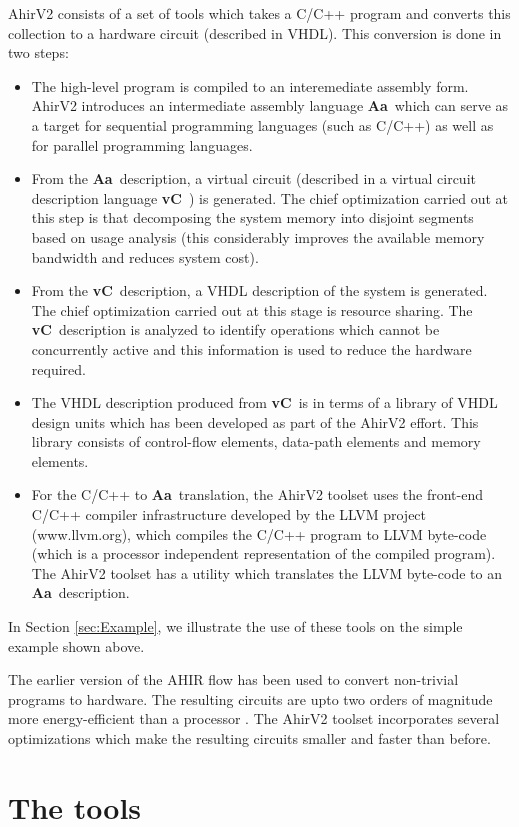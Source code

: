 \documentclass{article}
\newcommand{\Aa}{{\bf Aa}~}
\newcommand{\vC}{{\bf vC}~}
\begin{document}
AhirV2 consists of a set of tools which takes
a C/C++ program and converts this collection to
a hardware circuit (described in VHDL).   This
conversion is done in two steps:
\begin{itemize}
\item The high-level program is compiled
to an interemediate assembly form.  AhirV2
introduces an intermediate assembly language
\Aa  which can serve as a target for sequential
programming languages (such as C/C++) as
well as for parallel programming languages.
\item From the \Aa description, a virtual
circuit (described in a virtual circuit
description language \vC) is generated.
The chief optimization carried out at this
step is that decomposing the system memory
into disjoint segments based on usage
analysis (this considerably improves the
available memory bandwidth and reduces
system cost).
\item From the \vC description, a
VHDL description of the system is generated.
The chief optimization carried out at this
stage is resource sharing.  The \vC description
is analyzed to identify operations which
cannot be concurrently active and this information
is used to reduce the hardware required.
\item 
The VHDL description produced from 
\vC is in terms of a library
of VHDL design units which has been developed
as part of the AhirV2  effort.  This library
consists of control-flow elements, data-path
elements and memory elements.
\item 
For the C/C++ to \Aa translation, the
AhirV2 toolset uses the front-end C/C++ compiler
infrastructure developed by the LLVM project (www.llvm.org), which
compiles the C/C++ program to LLVM byte-code
(which is a processor independent representation
of the compiled program).  The AhirV2 toolset
has a utility which translates the LLVM byte-code
to an \Aa description.
\end{itemize}
In Section \ref{sec:Example}, 
we illustrate the use of these tools on the
simple example shown above.

The earlier version of the AHIR flow has been
used to convert non-trivial programs to hardware.
The resulting circuits are upto two orders of
magnitude more energy-efficient than
a processor \cite{ref:dsd2010}.  The AhirV2
toolset incorporates several optimizations which
make the resulting circuits smaller and 
faster than before.

\section{The tools}
\end{document}
